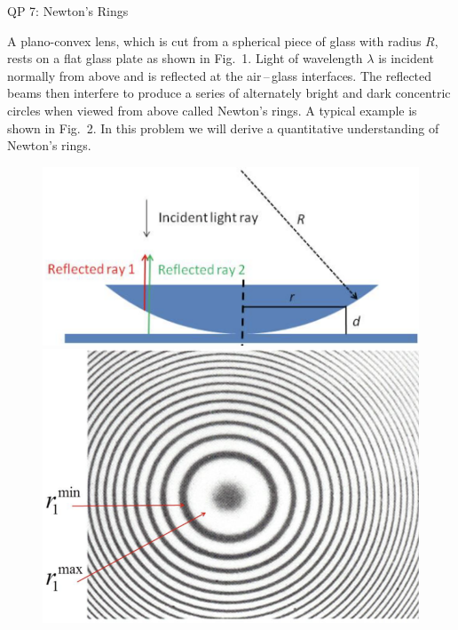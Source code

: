 \documentclass[12pt]{article}
\begin{document}
%
\begin{centering}
\LARGE{QP 7: Newton's Rings}
\end{centering}
\bigskip
\bigskip

A plano-convex lens, which is cut from a spherical piece of glass with
radius $R$, rests on a flat glass plate as shown in Fig.~1. Light of
wavelength $\lambda$ is incident normally from above and is reflected at the
air\,--\,glass interfaces. The reflected beams then interfere to produce a
series of alternately bright and dark concentric circles when viewed
from above called Newton’s rings. A typical example is shown in Fig.~2. 
In this problem we will derive a quantitative understanding of
Newton’s rings.

\begin{figure}[!h]
  \centering
  \begin{minipage}[b]{0.45\textwidth}
    \includegraphics[width=\textwidth]{Lens.png}
    \caption{}
  \end{minipage}
  \begin{minipage}[b]{0.45\textwidth}
    \includegraphics[width=\textwidth]{Rings.png}
    \caption{}
  \end{minipage}
\end{figure}
\end{document}
